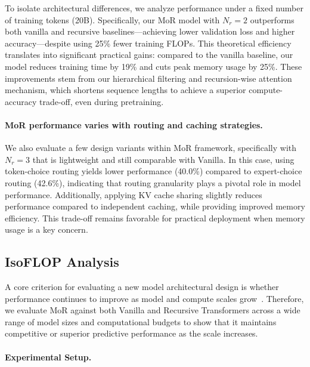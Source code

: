 To isolate architectural differences, we analyze performance under a fixed number of training tokens (20B). Specifically, our MoR model with $N_r=2$ outperforms both vanilla and recursive baselines—achieving lower validation loss and higher accuracy—despite using 25\% fewer training FLOPs. This theoretical efficiency translates into significant practical gains: compared to the vanilla baseline, our model reduces training time by 19\% and cuts peak memory usage by 25\%. These improvements stem from our hierarchical filtering and recursion-wise attention mechanism, which shortens sequence lengths to achieve a superior compute-accuracy trade-off, even during pretraining.



\vspace{-10pt}
\paragraph{MoR performance varies with routing and caching strategies.}

We also evaluate a few design variants within MoR framework, specifically with $N_r=3$ that is lightweight and still comparable with Vanilla. In this case, using token-choice routing yields lower performance (40.0\%) compared to expert-choice routing (42.6\%), indicating that routing granularity plays a pivotal role in model performance. Additionally, applying KV cache sharing slightly reduces performance compared to independent caching, while providing improved memory efficiency. This trade-off remains favorable for practical deployment when memory usage is a key concern.





\subsection{IsoFLOP Analysis}
\label{subsec:scaling_laws}

A core criterion for evaluating a new model architectural design is whether performance continues to improve as model and compute scales grow~\citep{kaplan2020scaling}. Therefore, we evaluate MoR against both Vanilla and Recursive Transformers across a wide range of model sizes and computational budgets to show that it maintains competitive or superior predictive performance as the scale increases.

\vspace{-10pt}
\paragraph{Experimental Setup.}

